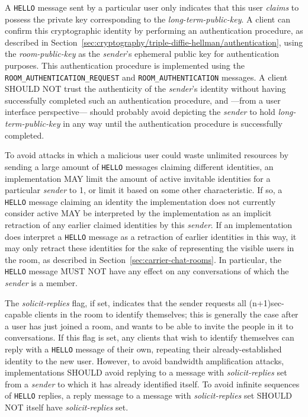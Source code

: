 \documentclass{article}
\def\message#1{\texttt{#1}}
\def\field#1{\textit{#1}}
\begin{document}
A \message{HELLO} message sent by a particular user only indicates that this user \emph{claims} to possess the private key corresponding to the \field{long-term-public-key}.
A client can confirm this cryptographic identity by performing an authentication procedure, as described in Section~\ref{sec:cryptography/triple-diffie-hellman/authentication}, using the \field{room-public-key} as the \field{sender}'s ephemeral public key for authentication purposes.
This authentication procedure is implemented using the \message{ROOM\_AUTHENTICATION\_REQUEST} and \message{ROOM\_AUTHENTICATION} messages.
A client SHOULD NOT trust the authenticity of the \field{sender}'s identity without having successfully completed such an authentication procedure, and ---from a user interface perspective--- should probably avoid depicting the \field{sender} to hold \field{long-term-public-key} in any way until the authentication procedure is successfully completed.

To avoid attacks in which a malicious user could waste unlimited resources by sending a large amount of \message{HELLO} messages claiming different identities, an implementation MAY limit the amount of active invitable identities for a particular \field{sender} to 1, or limit it based on some other characteristic.
If so, a \message{HELLO} message claiming an identity the implementation does not currently consider active MAY be interpreted by the implementation as an implicit retraction of any earlier claimed identities by this \field{sender}.
If an implementation does interpret a \message{HELLO} message as a retraction of earlier identities in this way, it may only retract these identities for the sake of representing the visible users in the room, as described in Section~\ref{sec:carrier-chat-rooms}.
In particular, the \message{HELLO} message MUST NOT have any effect on any conversations of which the \field{sender} is a member.

The \field{solicit-replies} flag, if set, indicates that the sender requests all (n+1)sec-capable clients in the room to identify themselves; this is generally the case after a user has just joined a room, and wants to be able to invite the people in it to conversations.
If this flag is set, any clients that wish to identify themselves can reply with a \message{HELLO} message of their own, repeating their already-established identity to the new user.
However, to avoid bandwidth amplification attacks, implementations SHOULD avoid replying to a message with \field{solicit-replies} set from a \field{sender} to which it has already identified itself.
To avoid infinite sequences of \message{HELLO} replies, a reply message to a message with \field{solicit-replies} set SHOULD NOT itself have \field{solicit-replies} set.
\end{document}
